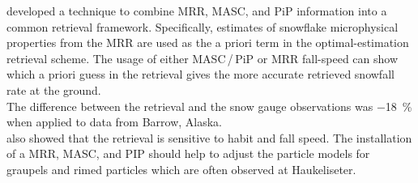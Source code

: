 \cite{cooper_variational_2017} developed a technique to combine MRR, MASC, and PiP information into a common retrieval framework. Specifically, estimates of snowflake microphysical properties from the MRR are used as the a priori term in the optimal-estimation retrieval scheme. The usage of either MASC\,/\,PiP or MRR fall-speed can show which a priori guess in the retrieval gives the more accurate retrieved snowfall rate at the ground. \\
The difference between the retrieval and the snow gauge observations was \SI{-18}{\percent} when applied to data from Barrow, Alaska.\\
\cite{cooper_variational_2017} also showed that the retrieval is sensitive to habit and fall speed. The installation of a MRR, MASC, and PIP should help to adjust the particle models for graupels and rimed particles which are often observed at Haukeliseter. 

